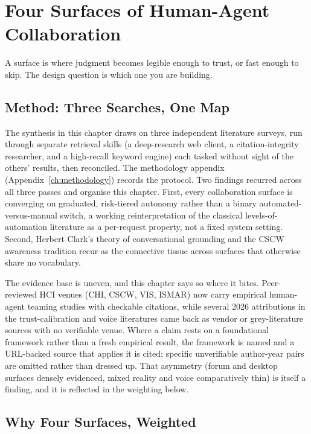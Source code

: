 \chapter{Four Surfaces of Human-Agent Collaboration}
\label{ch:four-surfaces}

\epigraph{A surface is where judgment becomes legible enough to trust, or fast enough to skip. The design question is which one you are building.}{}

\section{Method: Three Searches, One Map}

The synthesis in this chapter draws on three independent literature surveys, run through separate retrieval skills (a deep-research web client, a citation-integrity researcher, and a high-recall keyword engine) each tasked without sight of the others' results, then reconciled. The methodology appendix (Appendix~\ref{ch:methodology}) records the protocol. Two findings recurred across all three passes and organise this chapter. First, every collaboration surface is converging on graduated, risk-tiered autonomy rather than a binary automated-versus-manual switch, a working reinterpretation of the classical levels-of-automation literature as a per-request property, not a fixed system setting. Second, Herbert Clark's theory of conversational grounding and the CSCW awareness tradition recur as the connective tissue across surfaces that otherwise share no vocabulary.

The evidence base is uneven, and this chapter says so where it bites. Peer-reviewed HCI venues (CHI, CSCW, VIS, ISMAR) now carry empirical human-agent teaming studies with checkable citations, while several 2026 attributions in the trust-calibration and voice literatures came back as vendor or grey-literature sources with no verifiable venue. Where a claim rests on a foundational framework rather than a fresh empirical result, the framework is named and a URL-backed source that applies it is cited; specific unverifiable author-year pairs are omitted rather than dressed up. That asymmetry (forum and desktop surfaces densely evidenced, mixed reality and voice comparatively thin) is itself a finding, and it is reflected in the weighting below.

\section{Why Four Surfaces, Weighted}

